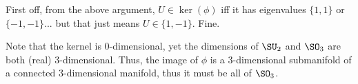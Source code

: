 \documentclass[11pt, headheight=30pt]{scrartcl}
\begin{document}
\begin{psec*}
    First off, from the above argument,
    $U\in \ker(\phi)$ iff it has eigenvalues $\{1,1\}$ or $\{-1,-1\}$...
    but that just means $U\in \{1, -1\}$. Fine.

    Note that the kernel is $0$-dimensional, yet the dimensions of $\SU_2$
    and $\SO_3$ are both (real) $3$-dimensional. Thus, the image
    of $\phi$ is a $3$-dimensional submanifold of a connected
    $3$-dimensional manifold, thus it must be all of $\SO_3$.
\end{psec*}
        

\end{document}
